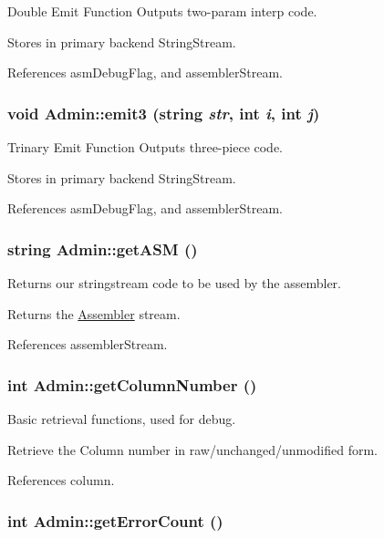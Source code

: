Double Emit Function Outputs two-\/param interp code. 

Stores in primary backend StringStream. 

References asmDebugFlag, and assemblerStream.

\hypertarget{classAdmin_ab97fe62f8c41b03f21082f5a9bc7ecfa}{
\subsubsection[{emit3}]{\setlength{\rightskip}{0pt plus 5cm}void Admin::emit3 (string {\em str}, \/  int {\em i}, \/  int {\em j})}}
\label{classAdmin_ab97fe62f8c41b03f21082f5a9bc7ecfa}


Trinary Emit Function Outputs three-\/piece code. 

Stores in primary backend StringStream. 

References asmDebugFlag, and assemblerStream.

\hypertarget{classAdmin_a40cf08260b4ca4200791ed3f13080153}{
\subsubsection[{getASM}]{\setlength{\rightskip}{0pt plus 5cm}string Admin::getASM ()}}
\label{classAdmin_a40cf08260b4ca4200791ed3f13080153}


Returns our stringstream code to be used by the assembler. 

Returns the \hyperlink{classAssembler}{Assembler} stream.

References assemblerStream.

\hypertarget{classAdmin_a576e2dfe10f528ad5f1816e673ed2e32}{
\subsubsection[{getColumnNumber}]{\setlength{\rightskip}{0pt plus 5cm}int Admin::getColumnNumber ()}}
\label{classAdmin_a576e2dfe10f528ad5f1816e673ed2e32}


Basic retrieval functions, used for debug. 

Retrieve the Column number in raw/unchanged/unmodified form.

References column.

\hypertarget{classAdmin_a1740ce0bc2f182fd337cb3d44a15b3fb}{
\subsubsection[{getErrorCount}]{\setlength{\rightskip}{0pt plus 5cm}int Admin::getErrorCount ()}}
\label{classAdmin_a1740ce0bc2f182fd337cb3d44a15b3fb}


